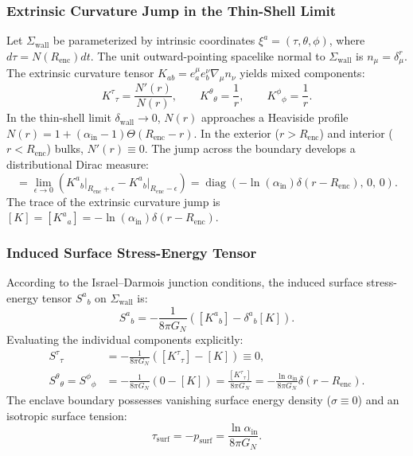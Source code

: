 \documentclass[11pt,onecolumn]{article}
\begin{document}
\subsubsection{Extrinsic Curvature Jump in the Thin-Shell Limit}
Let $\Sigma_{\text{wall}}$ be parameterized by intrinsic coordinates $\xi^a = (\tau, \theta, \phi)$, where $d\tau = N(R_{\text{enc}})dt$. The unit outward-pointing spacelike normal to $\Sigma_{\text{wall}}$ is $n_\mu = \delta^r_\mu$. The extrinsic curvature tensor $K_{ab} = e^\mu_a e^\nu_b \nabla_\mu n_\nu$ yields mixed components:
\begin{equation}
    K^\tau{}_\tau = \frac{N'(r)}{N(r)}, \qquad K^\theta{}_\theta = \frac{1}{r}, \qquad K^\phi{}_\phi = \frac{1}{r}.
    \label{eq:extrinsic_curvature_components}
\end{equation}
In the thin-shell limit $\delta_{\text{wall}} \to 0$, $N(r)$ approaches a Heaviside profile $N(r) = 1 + (\alpha_{\text{in}} - 1)\Theta(R_{\text{enc}} - r)$. In the exterior ($r > R_{\text{enc}}$) and interior ($r < R_{\text{enc}}$) bulks, $N'(r) \equiv 0$. The jump across the boundary develops a distributional Dirac measure:
\begin{equation}
    [K^a{}_b] = \lim_{\epsilon \to 0} \left( K^a{}_b\big|_{R_{\text{enc}}+\epsilon} - K^a{}_b\big|_{R_{\text{enc}}-\epsilon} \right) = \operatorname{diag}\left(-\ln(\alpha_{\text{in}})\delta(r - R_{\text{enc}}),\, 0,\, 0 \right).
    \label{eq:extrinsic_jump}
\end{equation}
The trace of the extrinsic curvature jump is $[K] = [K^a{}_a] = -\ln(\alpha_{\text{in}})\delta(r - R_{\text{enc}})$.

\subsubsection{Induced Surface Stress-Energy Tensor}
According to the Israel--Darmois junction conditions, the induced surface stress-energy tensor $S^a{}_b$ on $\Sigma_{\text{wall}}$ is:
\begin{equation}
    S^a{}_b = -\frac{1}{8\pi G_N} \left( [K^a{}_b] - \delta^a{}_b [K] \right).
    \label{eq:israel_junction}
\end{equation}
Evaluating the individual components explicitly:
\begin{align}
    S^\tau{}_\tau &= -\frac{1}{8\pi G_N} \left( [K^\tau{}_\tau] - [K] \right) \equiv 0, \label{eq:surface_energy_density} \\
    S^\theta{}_\theta = S^\phi{}_\phi &= -\frac{1}{8\pi G_N} \left( 0 - [K] \right) = \frac{[K^\tau{}_\tau]}{8\pi G_N} = -\frac{\ln \alpha_{\text{in}}}{8\pi G_N} \delta(r - R_{\text{enc}}). \label{eq:surface_tension}
\end{align}
The enclave boundary possesses vanishing surface energy density ($\sigma \equiv 0$) and an isotropic surface tension:
\begin{equation}
    \tau_{\text{surf}} = -p_{\text{surf}} = \frac{\ln \alpha_{\text{in}}}{8\pi G_N}.
    \label{eq:net_surface_tension}
\end{equation}
\end{document}
